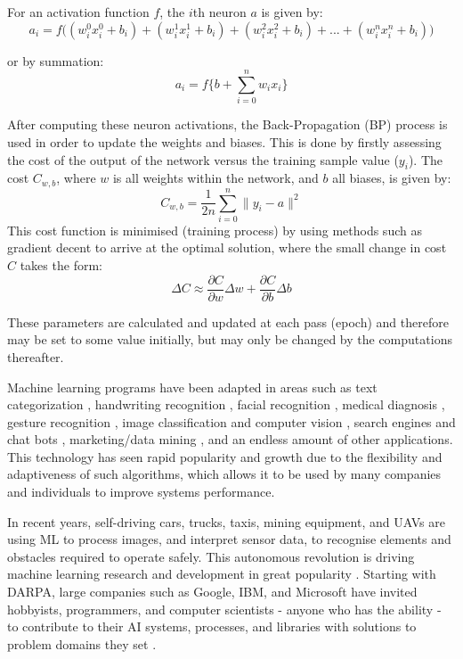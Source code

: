 \documentclass[fleqn,twoside]{article}
\begin{document}
For an activation function $f$, the $i$th neuron $a$ is given by:
\begin{equation}
a_i = f\bigg((w_i^0 x_i^0 + b_i) + (w_i^1 x_i^1 + b_i) + (w_i^2 x_i^2 + b_i) + ... + (w_i^n x_i^n + b_i)\bigg)
\end{equation}

or by summation: 
\begin{equation}
a_i = f\bigg\{b + \sum_{i=0}^{n} w_i x_i \bigg\}	
\end{equation}

After computing these neuron activations, the Back-Propagation (BP) process is used in order to update the weights and biases. This is done by firstly assessing the cost of the output of the network versus the training sample value ($y_i$). The cost $C_{w,b}$, where $w$ is all weights within the network, and $b$ all biases, is given by:
\begin{equation}
C_{w,b} = \frac{1}{2n} \sum_{i=0}^{n} \|y_i - a\|^2	
\end{equation}
This cost function is minimised (training process) by using methods such as gradient decent to arrive at the optimal solution, where the small change in cost $C$ takes the form:
\begin{equation}
\Delta C \approx \frac{\partial C}{\partial w} \Delta w + \frac{\partial C}{\partial b} \Delta b	
\end{equation}

These parameters are calculated and updated at each pass (epoch) and therefore may be set to some value initially, but may only be changed by the computations thereafter.

Machine learning programs have been adapted in areas such as text categorization \cite{sebastiani}, handwriting recognition \cite{bottou,bahlmann}, facial recognition \cite{bartlett,bartlett2,mohammed}, medical diagnosis \cite{shipp,ye,dreiseitl}, gesture recognition \cite{lustrek,rautaray}, image classification and computer vision \cite{chapelle,ciresan,krizhevsky}, search engines and chat bots \cite{boyan,graepel,jia}, marketing/data mining \cite{cui,bose}, and an endless amount of other applications. This technology has seen rapid popularity and growth due to the flexibility and adaptiveness of such algorithms, which allows it to be used by many companies and individuals to improve systems performance. 

In recent years, self-driving cars, trucks, taxis, mining equipment, and UAVs are using ML to process images, and interpret sensor data, to recognise elements and obstacles required to operate safely. This autonomous revolution is driving machine learning research and development in great popularity \cite{lecun}. Starting with DARPA, large companies such as Google, IBM, and Microsoft have invited hobbyists, programmers, and computer scientists - anyone who has the ability - to contribute to their AI systems, processes, and libraries with solutions to problem domains they set \cite{tensorflow,cortana,udacity,xprize}.
\end{document}
